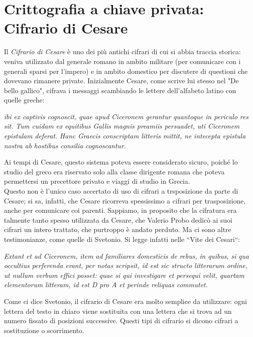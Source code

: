 \documentclass[italian,A4,12pt]{article}
\begin{document}
    \section{Crittografia a chiave privata: Cifrario di Cesare}
    Il \textit{Cifrario di Cesare} è uno dei più antichi cifrari di cui si abbia traccia storica: veniva utilizzato dal generale romano in ambito militare (per comunicare con i generali sparsi per l'impero) e in ambito domestico per discutere di questioni che dovevano rimanere private.
    Inizialmente Cesare, come scrive lui stesso nel "De bello gallico", cifrava i messaggi scambiando le lettere dell'alfabeto latino con quelle greche:
    \begin{displayquote}
      \textit{ibi ex captivis cognoscit, quae apud Ciceronem gerantur quantoque in periculo res sit.
      Tum cuidam ex equitibus Gallis magnis preamiis persuadet, uti Ciceronem epistulam deferat.
      Hanc Graecis conscriptam litteris mittit, ne intecepta epistula nostra ab hostibus consilia cognoscantur.}
    \end{displayquote}
    Ai tempi di Cesare, questo sistema poteva essere considerato sicuro, poiché lo studio del greco era riservato solo alla classe dirigente romana che poteva permettersi un precettore privato e viaggi di studio in Grecia.\\
    Questo non è l’unico caso accertato di uso di cifrari a trsposizione da parte di Cesare; si sa, infatti, che Cesare ricorreva spessissimo a cifrari per trasposizione, anche per comunicare coi parenti. Sappiamo, in proposito che la cifratura era talmente tanto spesso utilizzata da Cesare, che Valerio Probo dedicò ai suoi cifrari un intero trattato, che purtroppo è andato perduto. Ma ci sono altre testimonianze, come quelle di Svetonio. Si legge infatti nelle “Vite dei Cesari“:
    \begin{displayquote}
      \textit{Extant et ad Ciceronem, item ad familiares domesticis de rebus, in quibus, si qua occultius perferenda erant, per notas scripsit, id est sic structo litterarum ordine, ut nullum verbum effici posset: quae si qui investigare et persequi velit, quartam elementorum litteram, id est D pro A et perinde reliquas commutet.\\}
    \end{displayquote}
    Come ci dice Svetonio, il cifrario di Cesare era molto semplice da utilizzare: ogni lettera del testo in chiaro viene sostituita con una lettera che si trova ad un numero fissato di posizioni successive. Questi tipi di cifrario si dicono cifrari a sostituzione o scorrimento.\\
\end{document}
